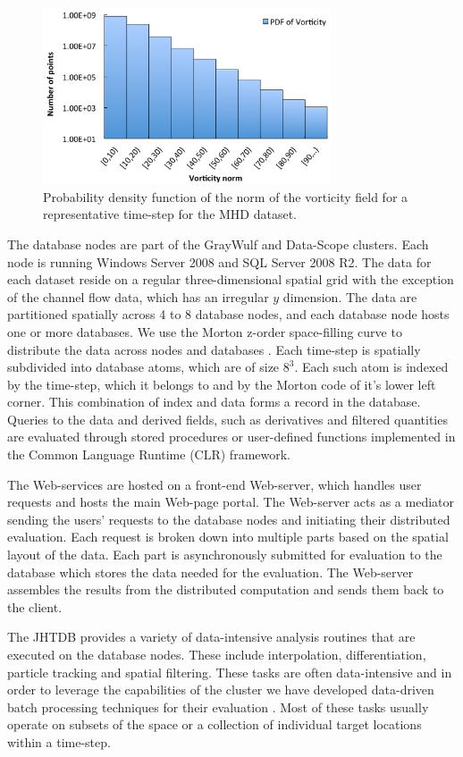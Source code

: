 \documentclass{sig-alternate}
\begin{document}
\begin{figure}
\centering
\includegraphics[width=3.35in]{Figures/pdf.pdf}
\caption{Probability density function of the norm of the vorticity field for a representative time-step for the MHD dataset.}
\label{fig:pdf}
\end{figure}

The database nodes are part of the GrayWulf \cite{Szalay} and Data-Scope \cite{DataScope} clusters. Each node
is running Windows Server 2008 and SQL Server 2008 R2. The data for each dataset reside on a regular three-dimensional spatial grid with the
exception of the channel flow data, which has an irregular $y$ dimension. The data are partitioned spatially across 4 to 8
database nodes, and each database node hosts one or more databases. We use the Morton z-order space-filling
curve to distribute the data across nodes and databases \cite{Perlman}. Each time-step is spatially subdivided
into database atoms, which are of size $8^3$. Each such atom is indexed by the time-step, which it belongs to and
by the Morton code of it's lower left corner. This combination of index and data forms a record in the database.
Queries to the data and derived fields, such as derivatives and filtered quantities are evaluated through
stored procedures or user-defined functions implemented in the Common Language Runtime (CLR) framework.

The Web-services are hosted on a front-end Web-server, which handles user requests and hosts the main Web-page portal.
The Web-server acts as a mediator sending the users' requests to the database nodes and initiating their distributed evaluation. 
Each request is broken down into multiple parts based on the spatial layout of the data. Each part is asynchronously submitted for evaluation 
to the database which stores the data needed for the evaluation.
The Web-server assembles the results from the distributed computation and sends them back to the client.

The JHTDB provides a variety of data-intensive analysis routines that are executed on the database nodes. These include interpolation, 
differentiation, particle tracking and spatial filtering. These tasks are often data-intensive and in order to leverage the capabilities of the cluster we
have developed data-driven batch processing techniques for their evaluation \cite{KanovSC11, KanovSC12}. Most of these tasks usually operate on subsets
of the space or a collection of individual target locations within a time-step. 
\end{document}
